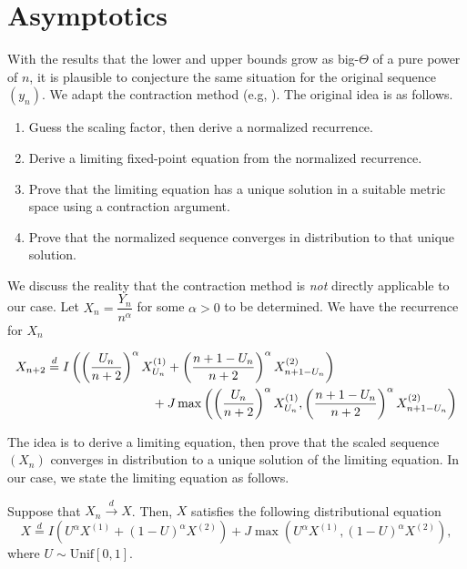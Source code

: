 


\section{Asymptotics}

With the results that the lower and upper bounds grow as big-$\Theta$ of a pure power of $n$, it is plausible to conjecture the same situation for the original sequence $(y_n)$. We adapt the contraction method (e.g, \cite{neininger2004general}). The original idea is as follows.
\begin{enumerate}
  \item Guess the scaling factor, then derive a normalized recurrence.
  \item Derive a limiting fixed-point equation from the normalized recurrence.
  \item Prove that the limiting equation has a unique solution in a suitable metric space using a contraction argument.
  \item Prove that the normalized sequence converges in distribution to that unique solution.
\end{enumerate}
We discuss the reality that the contraction method is \textit{not} directly applicable to our case. Let $X_n = \dfrac{Y_n}{n^\alpha}$ for some $\alpha > 0$ to be determined. We have the recurrence for $X_n$

\begin{equation}
  \label{eq:scaled-recurrence}
  \begin{aligned}
    X_{n+2}
     & \stackrel{d}{=} I\left(\left(\dfrac{U_n}{n+2}\right)^\alpha X_{U_n}^{(1)} + \left(\dfrac{n+1-U_n}{n+2}\right)^\alpha X_{n+1-U_n}^{(2)}\right)   \\
     & \myspace{50} + J\max\left(\left(\dfrac{U_n}{n+2}\right)^\alpha X_{U_n}^{(1)}, \left(\dfrac{n+1-U_n}{n+2}\right)^\alpha X_{n+1-U_n}^{(2)}\right)
  \end{aligned}
\end{equation}

The idea is to derive a limiting equation, then prove that the scaled sequence $(X_n)$ converges in distribution to a unique solution of the limiting equation. In our case, we state the limiting equation as follows.

\begin{lemma}
  \label{lem:limiting-equation}
  Suppose that $X_n \stackrel{d}{\to} X$. Then, $X$ satisfies the following distributional equation
  \begin{equation}
    \label{eq:limiting-equation}
    X \stackrel{d}{=} I\left(U^\alpha X^{(1)} + (1-U)^\alpha X^{(2)}\right) + J\max(U^\alpha X^{(1)}, (1-U)^\alpha X^{(2)}),
  \end{equation}
  where $U \sim \mathrm{Unif}[0,1]$.
\end{lemma}

